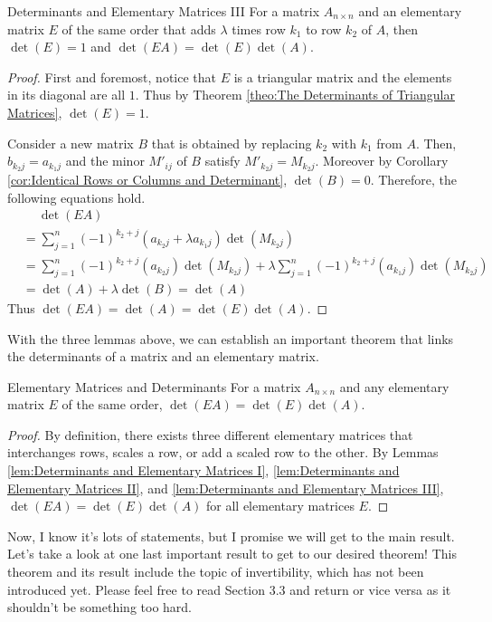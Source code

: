 \documentclass[../../../main.tex]{subfiles}
\begin{document}
\begin{lemma}{}{Determinants and Elementary Matrices III}
For a matrix $A_{n \times n}$ and an elementary matrix $E$ of
the same order that adds $\lambda$ times row $k_1$ to row $k_2$
of $A$, then $\det(E) = 1$ and $\det(EA) = \det(E) \det(A)$.
\end{lemma}
\begin{proof}
First and foremost, notice that $E$ is a triangular matrix and
the elements in its diagonal are all $1$. Thus by Theorem
\ref{theo:The Determinants of Triangular Matrices}, $\det(E) = 1$.

Consider a new matrix $B$ that is obtained by replacing $k_2$
with $k_1$ from $A$. Then, $b_{k_2j} = a_{k_1j}$ and the minor
$M'_{ij}$ of $B$ satisfy $M'_{k_2j} = M_{k_2j}$. Moreover by Corollary
\ref{cor:Identical Rows or Columns and Determinant}, $\det(B) = 0$.
Therefore, the following equations hold.
\begin{align*}
    &\quad\ \det(EA) \\
    &= \sum_{j=1}^n (-1)^{k_2 + j} (a_{k_2j} + \lambda a_{k_1j})
        \det(M_{k_2j}) \\
    &= \sum_{j=1}^n (-1)^{k_2 + j} (a_{k_2j}) \det(M_{k_2j}) +
        \lambda \sum_{j=1}^n (-1)^{k_2 + j} (a_{k_1j})
            \det(M_{k_2j}) \\
    &= \det(A) + \lambda \det(B)
    = \det(A)
\end{align*}
Thus $\det(EA) = \det(A) = \det(E) \det(A)$.
\end{proof}

With the three lemmas above, we can establish an important theorem
that links the determinants of a matrix and an elementary matrix.

\begin{theorem}{}{Elementary Matrices and Determinants}
For a matrix $A_{n \times n}$ and any elementary matrix $E$ of the
same order, $\det(EA) = \det(E) \det(A)$.
\end{theorem}
\begin{proof}
By definition, there exists three different elementary matrices that
interchanges rows, scales a row, or add a scaled row to the other.
By Lemmas \ref{lem:Determinants and Elementary Matrices I},
\ref{lem:Determinants and Elementary Matrices II}, and
\ref{lem:Determinants and Elementary Matrices III}, $\det(EA) =
\det(E) \det(A)$ for all elementary matrices $E$.
\end{proof}

Now, I know it's lots of statements, but I promise we will get to
the main result. Let's take a look at one last important result to
get to our desired theorem! This theorem and its result include
the topic of invertibility, which has not been introduced yet. Please
feel free to read Section 3.3 and return or vice versa as it shouldn't
be something too hard.
\end{document}
